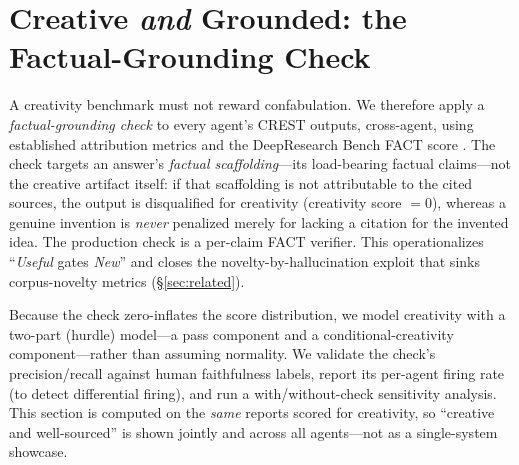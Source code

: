 \section{Creative \emph{and} Grounded: the Factual-Grounding Check}
\label{sec:grounding}

A creativity benchmark must not reward confabulation. We therefore apply a \emph{factual-grounding check} to every agent's CREST outputs, cross-agent, using established attribution metrics \citep{gao2023alce,rashkin2023ais,min2023factscore} and the DeepResearch Bench FACT score \citep{du2025deepresearchbench}. The check targets an answer's \emph{factual scaffolding}---its load-bearing factual claims---not the creative artifact itself: if that scaffolding is not attributable to the cited sources, the output is disqualified for creativity (creativity score $=0$), whereas a genuine invention is \emph{never} penalized merely for lacking a citation for the invented idea. The production check is a per-claim FACT verifier. This operationalizes ``\emph{Useful} gates \emph{New}'' and closes the novelty-by-hallucination exploit that sinks corpus-novelty metrics (\S\ref{sec:related}).

Because the check zero-inflates the score distribution, we model creativity with a two-part (hurdle) model---a pass component and a conditional-creativity component---rather than assuming normality. We validate the check's precision/recall against human faithfulness labels, report its per-agent firing rate (to detect differential firing), and run a with/without-check sensitivity analysis. This section is computed on the \emph{same} reports scored for creativity, so ``creative and well-sourced'' is shown jointly and across all agents---not as a single-system showcase.
